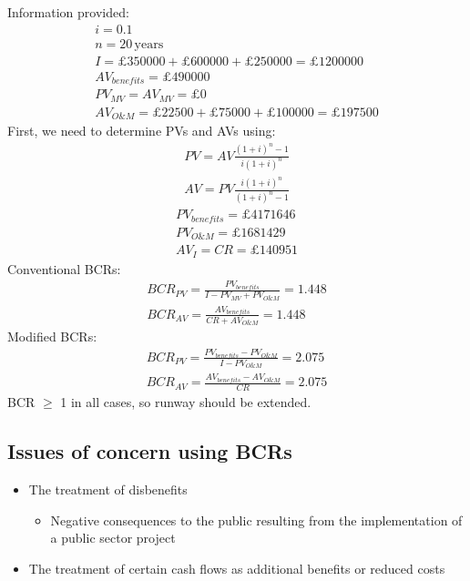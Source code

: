Information provided:
\begin{gather}
  i = 0.1\\
  n = 20\, \textrm{years}\\
  I = \pounds 350000 + \pounds 600000 + \pounds 250000 = \pounds 1200000\\
  AV_{benefits} = \pounds 490000\\
  PV_{MV} = AV_{MV} = \pounds 0\\
  AV_{O\&M} = \pounds 22500 + \pounds 75000 + \pounds 100000 = \pounds 197500
\end{gather}
First, we need to determine PVs and AVs using:
\begin{gather}
  PV = AV\frac{\left(1+i\right)^n - 1}{i\left(1 + i\right)^n}\\
  AV = PV\frac{i\left(1+i\right)^n}{\left(1+i\right)^n - 1}
\end{gather}
\begin{gather}
  PV_{benefits} = \pounds 4171646\\
  PV_{O\&M} = \pounds 1681429\\
  AV_I = CR = \pounds 140951
\end{gather}
Conventional BCRs:
\begin{gather}
  BCR_{PV} = \frac{PV_{benefits}}{I - PV_{MV}+PV_{O\&M}} = 1.448\\
  BCR_{AV} = \frac{AV_{benefits}}{CR + AV_{O\&M}} = 1.448
\end{gather}
Modified BCRs:
\begin{gather}
  BCR_{PV} = \frac{PV_{benefits} - PV_{O\&M}}{I - PV_{O\&M}} = 2.075\\
  BCR_{AV} = \frac{AV_{benefits}- AV_{O\&M}}{CR} = 2.075
\end{gather}
BCR $\geq$ 1 in all cases, so runway should be extended.
\subsection{Issues of concern using BCRs}
\begin{itemize}
  \item The treatment of disbenefits
        \begin{itemize}
          \item Negative consequences to the public resulting from the implementation of a public sector project
        \end{itemize}
  \item The treatment of certain cash flows as additional benefits or reduced costs
\end{itemize}

